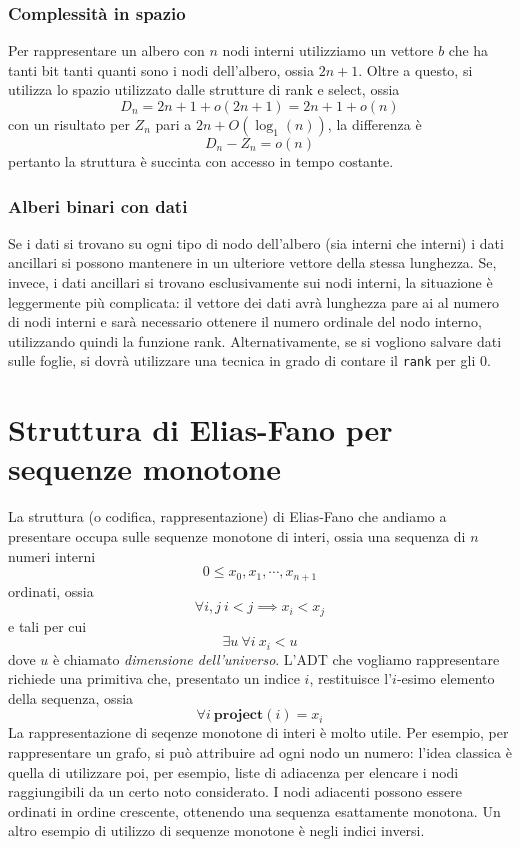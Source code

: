 \subsubsection{Complessità in spazio}
Per rappresentare un albero con $n$ nodi interni utilizziamo un vettore $b$ che ha tanti
bit tanti quanti sono i nodi dell'albero, ossia $2n +1$. Oltre a questo, si utilizza
lo spazio utilizzato dalle strutture di rank e select, ossia
$$
	D_n = 2n +1 + o(2n+1) = 2n + 1 + o(n)
$$
con un risultato per $Z_n$ pari a $2n + O(\log_1(n))$, la differenza è
$$
	D_n - Z_n = o(n)
$$
pertanto la struttura è succinta con accesso in tempo costante.

\subsubsection{Alberi binari con dati}
Se i dati si trovano su ogni tipo di nodo dell'albero (sia interni che interni) i dati
ancillari si possono mantenere in un ulteriore vettore della stessa lunghezza.
Se, invece, i dati ancillari si trovano esclusivamente sui nodi interni,
la situazione è leggermente più complicata: il vettore dei dati avrà
lunghezza pare ai al numero di nodi interni e sarà necessario ottenere il numero
ordinale del nodo interno, utilizzando quindi la funzione rank.
Alternativamente, se si vogliono salvare dati sulle foglie, si dovrà utilizzare
una tecnica in grado di contare il \texttt{rank} per gli $0$.

\section{Struttura di Elias-Fano per sequenze monotone}
La struttura (o codifica, rappresentazione) di Elias-Fano che andiamo
a presentare occupa sulle sequenze monotone di interi, ossia
una sequenza di $n$ numeri interni
$$
	0 \leq x_0, x_1, \cdots, x_{n+1}
$$
ordinati, ossia
$$
	\forall i, j ~ i < j \implies x_i < x_j
$$
e tali per cui
$$
	\exists u ~ \forall i ~ x_i < u
$$
dove $u$ è chiamato \textit{dimensione dell'universo}.
L'ADT che vogliamo rappresentare richiede una primitiva
che, presentato un indice $i$, restituisce l'$i$-esimo elemento della sequenza,
ossia
$$
	\forall i ~ \mathbf{project}(i) = x_i
$$
La rappresentazione di seqenze monotone di interi è molto utile.
Per esempio, per rappresentare un grafo, si può attribuire ad ogni
nodo un numero: l'idea classica è quella di utilizzare poi, per esempio,
liste di adiacenza per elencare i nodi raggiungibili da un certo noto
considerato. I nodi adiacenti possono essere ordinati in ordine crescente,
ottenendo una sequenza esattamente monotona.
Un altro esempio di utilizzo di sequenze monotone è negli indici inversi.


